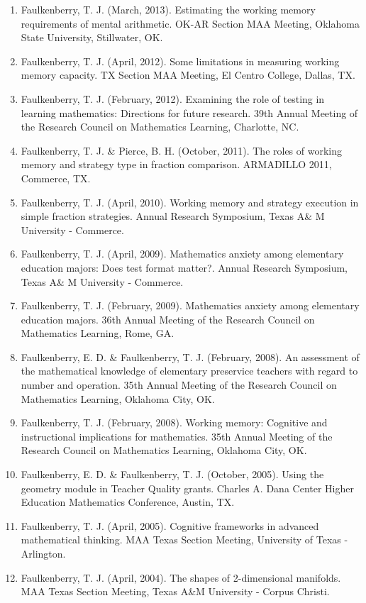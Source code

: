 \documentclass[article,10pt]{article}
\begin{document}
\begin{enumerate}
\item Faulkenberry, T. J. (March, 2013). Estimating the working memory requirements of mental arithmetic. OK-AR Section MAA Meeting, Oklahoma State University, Stillwater, OK.
\item Faulkenberry, T. J. (April, 2012). Some limitations in measuring working memory capacity. TX Section MAA Meeting, El Centro College, Dallas, TX.
\item Faulkenberry, T. J. (February, 2012). Examining the role of testing in learning mathematics: Directions for future research. 39th Annual Meeting of the Research Council on Mathematics Learning, Charlotte, NC.
\item Faulkenberry, T. J. \& Pierce, B. H. (October, 2011). The roles of working memory and strategy type in fraction comparison. ARMADILLO 2011, Commerce, TX.
\item Faulkenberry, T. J. (April, 2010). Working memory and strategy execution in simple fraction strategies. Annual Research Symposium, Texas A\& M University - Commerce.
\item Faulkenberry, T. J. (April, 2009). Mathematics anxiety among elementary education majors: Does test format matter?. Annual Research Symposium, Texas A\& M University - Commerce.
\item Faulkenberry, T. J. (February, 2009). Mathematics anxiety among elementary education majors. 36th Annual Meeting of the Research Council on Mathematics Learning, Rome, GA.
\item Faulkenberry, E. D. \& Faulkenberry, T. J. (February, 2008). An assessment of the mathematical knowledge of elementary preservice teachers with regard to number and operation. 35th Annual Meeting of the Research Council on Mathematics Learning, Oklahoma City, OK.
\item Faulkenberry, T. J. (February, 2008). Working memory: Cognitive and instructional implications for mathematics. 35th Annual Meeting of the Research Council on Mathematics Learning, Oklahoma City, OK.
\item Faulkenberry, E. D. \& Faulkenberry, T. J. (October, 2005). Using the geometry module in Teacher Quality grants. Charles A. Dana Center Higher Education Mathematics Conference, Austin, TX.
\item Faulkenberry, T. J. (April, 2005). Cognitive frameworks in advanced mathematical thinking. MAA Texas Section Meeting, University of Texas - Arlington.
\item Faulkenberry, T. J. (April, 2004). The shapes of 2-dimensional manifolds. MAA Texas Section Meeting, Texas A\&M University - Corpus Christi.

\end{enumerate}
\end{document}
